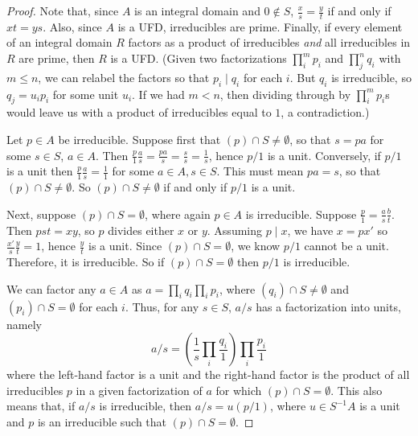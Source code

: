 \documentclass[10pt]{article}
\begin{document}
\begin{enumerate}
\begin{proof}
Note that, since $A$ is an integral domain and $0 \not \in S$, $\frac{x}{s} = \frac{y}{t}$ if and only if $xt = ys$.  Also, since $A$ is a UFD, irreducibles are prime.  Finally, if every element of an integral domain $R$ factors as a product of irreducibles \emph{and} all irreducibles in $R$ are prime, then $R$ is a UFD.  (Given two factorizations $\prod_i^m p_i$ and $\prod_j^n q_i$ with $m \leq n$, we can relabel the factors so that $p_i \mid q_i$ for each $i$.  But $q_i$ is irreducible, so $q_j = u_i p_i$ for some unit $u_i$.  If we had $m < n$, then dividing through by $\prod_i^m p_i$s would leave us with a product of irreducibles equal to $1$, a contradiction.)

Let $p \in A$ be irreducible.  Suppose first that $(p) \cap S \neq \emptyset$, so that $s = pa$ for some $s \in S$, $a \in A$.  Then $\frac{p}{1}\frac{a}{s} = \frac{pa}{s} = \frac{s}{s} = \frac1s$, hence $p/1$ is a unit.  Conversely, if $p/1$ is a unit then $\frac{p}{1} \frac{a}{s} = \frac{1}{1}$ for some $a \in A, s \in S$.  This must mean $pa = s$, so that $(p) \cap S \neq \emptyset$.  So $(p) \cap S \neq \emptyset$ if and only if $p/1$ is a unit.

Next, suppose $(p) \cap S = \emptyset$, where again $p \in A$ is irreducible.  Suppose $\frac{p}{1} = \frac{a}{s} \frac{b}{t}$.  Then $pst = xy$, so $p$ divides either $x$ or $y$.  Assuming $p \mid x$, we have $x = px'$ so $\frac{x'}{s}\frac{y}{t} = 1$, hence $\frac{y}{t}$ is a unit.  Since $(p) \cap S = \emptyset$, we know $p/1$ cannot be a unit.  Therefore, it is irreducible.  So if $(p) \cap S = \emptyset$ then $p/1$ is irreducible. 


We can factor any $a \in A$ as $a = \prod_i q_i \prod_i p_i$, where $(q_i) \cap S \neq \emptyset$ and $(p_i) \cap S = \emptyset$ for each $i$.  Thus, for any $s \in S$, $a/s$ has a factorization into units, namely
$$
a/s = \left( \frac{1}{s} \prod_i \frac{q_i}{1} \right) \prod_i \frac{p_i}{1}
$$
where the left-hand factor is a unit and the right-hand factor is the product of all irreducibles $p$ in a given factorization of $a$ for which $(p) \cap S = \emptyset$.  This also means that, if $a/s$ is irreducible, then $a/s = u (p/1)$, where $u \in S^{-1}A$ is a unit and $p$ is an irreducible such that $(p)\cap S = \emptyset$.


\end{proof}
\end{enumerate}
\end{document}
